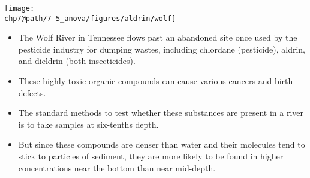 \documentclass[slidestop,compress,mathserif]{beamer}
\makeatletter
\def\chp7@path{../../Chp 7}
\makeatother
\begin{document}
\begin{frame}
\frametitle{}

\begin{center}
\texttt{[image: \\chp7@path/7-5\_anova/figures/aldrin/wolf]}
\end{center}

{\small
\begin{itemize}

\item  The Wolf River in Tennessee flows past an abandoned site once used by the pesticide industry for dumping wastes, including chlordane (pesticide), aldrin, and dieldrin (both insecticides).

\pause

\item These highly toxic organic compounds can cause various cancers and birth defects.

\pause

\item The standard methods to test whether these substances are present in a river is to take samples at six-tenths depth. 

\pause

\item But since these compounds are denser than water and their molecules tend to stick to particles of sediment, they are more likely to be found in higher concentrations near the bottom than near mid-depth.

\end{itemize}
}

\end{frame}

\end{document}
